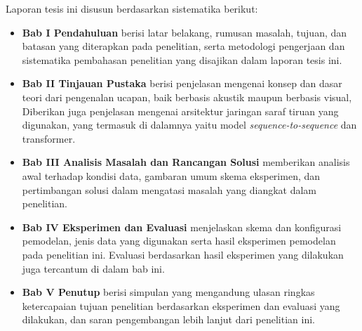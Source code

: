Laporan tesis ini disusun berdasarkan sistematika berikut:
\begin{itemize}[label={}]
    \item \textbf{Bab I Pendahuluan} berisi latar belakang, rumusan masalah, tujuan, dan batasan yang diterapkan pada penelitian, serta metodologi pengerjaan dan sistematika pembahasan penelitian yang disajikan dalam laporan tesis ini.
    \item \textbf{Bab II Tinjauan Pustaka} berisi penjelasan mengenai konsep dan dasar teori dari pengenalan ucapan, baik berbasis akustik maupun berbasis visual, Diberikan juga penjelasan mengenai arsitektur jaringan saraf tiruan yang digunakan, yang termasuk di dalamnya yaitu model \textit{sequence-to-sequence} dan transformer.
    \item \textbf{Bab III Analisis Masalah dan Rancangan Solusi} memberikan analisis awal terhadap kondisi data, gambaran umum skema eksperimen, dan pertimbangan solusi dalam mengatasi masalah yang diangkat dalam penelitian.
    \item \textbf{Bab IV Eksperimen dan Evaluasi} menjelaskan skema dan konfigurasi pemodelan, jenis data yang digunakan serta hasil eksperimen pemodelan pada penelitian ini. Evaluasi berdasarkan hasil eksperimen yang dilakukan juga tercantum di dalam bab ini.
    \item \textbf{Bab V Penutup} berisi simpulan yang mengandung ulasan ringkas ketercapaian tujuan penelitian berdasarkan eksperimen dan evaluasi yang dilakukan, dan saran pengembangan lebih lanjut dari penelitian ini.
\end{itemize}
